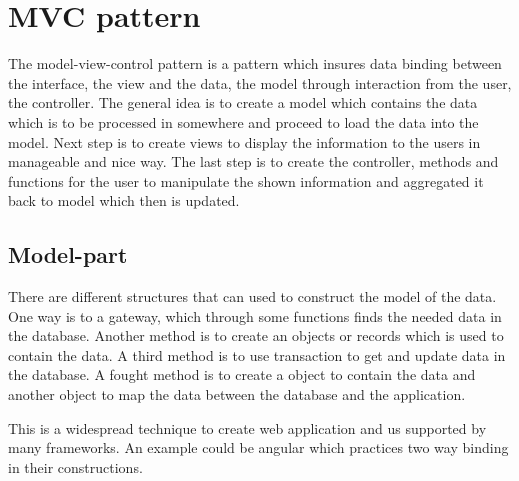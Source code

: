 \section{MVC pattern}
The model-view-control pattern is a pattern which insures data binding between the interface, the view and the data, the model through interaction from the user, the controller.
The general idea is to create a model which contains the data which is to be processed in somewhere and proceed to load the data into the model.
Next step is to create views to display the information to the users in manageable and nice way. The last step is to create the controller, methods and functions for the user to manipulate the shown information and aggregated it back to model which then is updated.

\subsection{Model-part}
There are different structures that can used to construct the model of the data. One way is to a gateway, which through some functions finds the needed data in the database. Another method is to create an objects or records which is used to contain the data. A third method is to use transaction to get and update data in the database. A fought method is to create a object to contain the data and another object to map the data between the database and the application.


This is a widespread technique to create web application and us supported by many frameworks. An example could be angular which practices two way binding in their constructions.